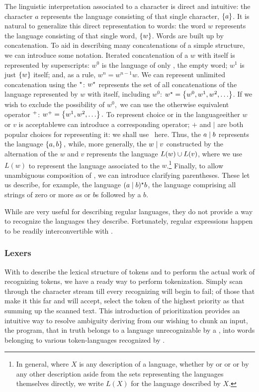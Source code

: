 The linguistic interpretation associated to a character is direct and intuitive: the character $a$ represents the language consisting of that single character, $\left\{ a \right\}$. It is natural to generalize this direct representation to words: the word $w$ represents the language consisting of that single word, $\left\{ w \right\}$. Words are built up by concatenation. To aid in describing many concatenations of a simple structure, we can introduce some notation. Iterated concatenation of a \regex $w$ with itself is represented by superscripts: $w^{0}$ is the language of only \emptyword, the empty word; $w^{1}$ is just $\left\{ w \right\}$ itself; and, as a rule, $w^{n} = w^{n-1}w$. We can represent unlimited concatenation using the  $^{\star}{}$: $w^{\star}{}$ represents the set of all concatenations of the language represented by $w$ with itself, including $w^{0}$: $w\kstar = \set{w^{0}, w^{1}, w^{2}, \dotsc}$. If we wish to exclude the possibility of $w^{0},$ we can use the otherwise equivalent  operator $^{+}{}$: $w\posclos = \set{w^{1}, w^{2}, \dotsc}.$ To represent choice or  in the language\empause either \regex $w$ or \regex $v$ is acceptable\empause we can introduce a corresponding operator; $+$ and $\vert$ are both popular choices for representing it: we shall use \alt\ here. Thus, the \regex $a \mid b$ represents the language $\left\{ a, b \right\},$ while, more generally, the \regex $w \mid v$ constructed by the alternation of the \regexes $w$ and $v$ represents the language $L(w) \cup L(v)$, where we use $L(w)$ to represent the language associated to the \regex $w$.\footnote{In general, where $X$ is any description of a language, whether by \TM or \FA or \regex or by any other description aside from the sets representing the languages themselves directly, we write $L(X)$ for the language described by $X$.} Finally, to allow unambiguous composition of \regexes, we can introduce clarifying parentheses. These let us describe, for example, the language $(a \mid b)^{\star}{} b$, the language comprising all strings of zero or more $a$s or $b$s followed by a $b$.

While \regexes are very useful for describing regular languages, they do not provide a way to recognize the languages they describe. Fortunately, regular expressions happen to be readily interconvertible with \FAs.

\subsubsection{Lexers}
With \regexes to describe the lexical structure of tokens and \FAs to perform the actual work of recognizing tokens, we have a ready way to perform tokenization. Simply scan through the character stream till every recognizing \FA will begin to fail; of those that make it this far and will accept, select the token of the highest priority as that summing up the scanned text. This introduction of prioritization provides an intuitive way to resolve ambiguity deriving from our wishing to chunk an input, the program, that in truth belongs to a language unrecognizable by a \FA{}, into words belonging to various token-languages recognized by \FAs.

